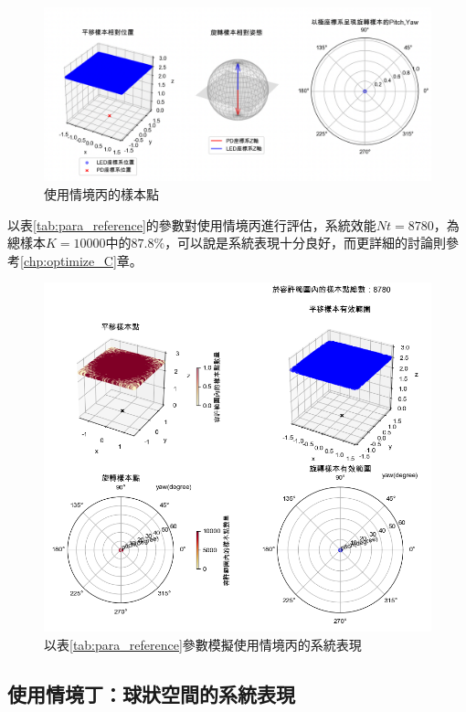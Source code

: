 \begin{figure}[htpb]
    \centering
    \includegraphics[width=15cm]{ch4pic/c_scenario.png}
    \caption{使用情境丙的樣本點}
    \label{pic:c_scenario}
\end{figure}

以表\ref{tab:para_reference}的參數對使用情境丙進行評估，系統效能$Nt=8780$，為總樣本$K=10000$中的$87.8\%$，可以說是系統表現十分良好，而更詳細的討論則參考\ref{chp:optimize_C}章。

\begin{figure}[htpb]
    \centering
    \includegraphics[width=15cm]{ch4pic/scene_c_solve.png}
    \caption{以表\ref{tab:para_reference}參數模擬使用情境丙的系統表現}
    \label{pic:scenario_c_solve}
\end{figure}


\subsection{使用情境丁：球狀空間的系統表現}
\label{chp:scene_D}



